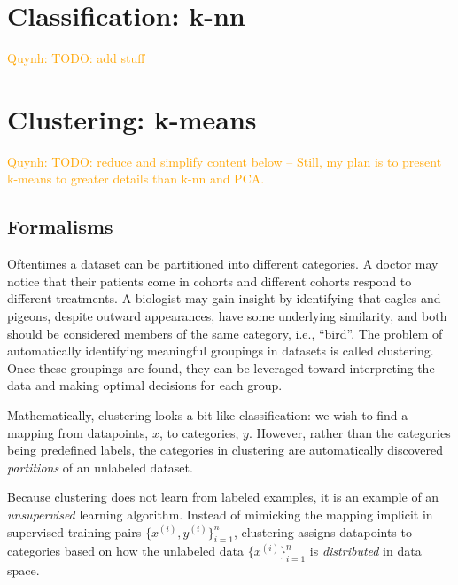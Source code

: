\documentclass[11pt]{article}
\newcommand{\qn}[1]{\textcolor{orange}{Quynh: #1}}
\begin{document}
\section{Classification: k-nn}
\qn{TODO: add stuff}

\section{Clustering: k-means}
\qn{TODO: reduce and simplify content below -- Still, my plan is to present k-means to greater details than k-nn and PCA.}

\subsection{Formalisms}
Oftentimes a dataset can be partitioned into different categories. A doctor may notice that their patients come in cohorts and different cohorts respond to different treatments. A biologist may gain insight by identifying that eagles and pigeons, despite outward appearances, have some underlying similarity, and both should be considered members of the same category, i.e., ``bird''. The problem of automatically identifying meaningful groupings in datasets is called clustering. Once these groupings are found, they can be leveraged toward interpreting the data and making optimal decisions for each group.



Mathematically, clustering looks a bit like classification: we wish to find a mapping from datapoints, $x$, to categories, $y$. However, rather than the categories being predefined labels, the categories in clustering are automatically discovered \textit{partitions} of an unlabeled dataset.

Because clustering does not learn from labeled examples, it is an example of an \textit{unsupervised} learning algorithm. Instead of mimicking the mapping implicit in supervised training pairs $\{x^{(i)},y^{(i)}\}_{i=1}^n$, clustering assigns datapoints to categories based on how the unlabeled data $\{x^{(i)}\}_{i=1}^n$ is \textit{distributed} in data space.
\end{document}
